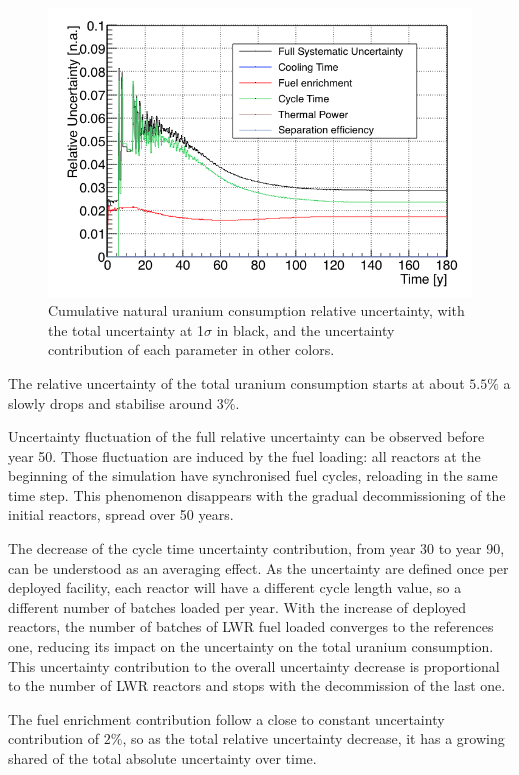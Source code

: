 \documentclass{anstrans}
\begin{document}
\begin{figure}[t] %
    \centering
    \includegraphics[scale=0.3]{unat_uncer}
    \caption{Cumulative natural uranium consumption relative uncertainty, with
    the total uncertainty at 1$\sigma$ in black, and the uncertainty
    contribution of each parameter in other colors.}\label{fig:unatr_uncer}
\end{figure}
The relative uncertainty of the total uranium consumption starts at about
$5.5\%$ a slowly drops and stabilise around $3\%$.

Uncertainty fluctuation of the full relative uncertainty can be observed before
year 50.  Those fluctuation are induced by the fuel loading: all reactors at the
beginning of the simulation have synchronised fuel cycles, reloading in the same time step.
This phenomenon disappears
with the gradual decommissioning of the initial reactors, spread over 50 years.

The decrease of the cycle time uncertainty contribution, from year 30 to year
90, can be understood as an averaging effect.  As the uncertainty are defined once
per deployed facility, each reactor will have a different cycle
length value, so a different number of batches loaded per year.  With the increase
of deployed reactors, the number of batches of \gls{LWR} fuel loaded converges
to the references one, reducing its impact on the uncertainty on the total
uranium consumption. This uncertainty contribution to the overall uncertainty
decrease is proportional to the number of \gls{LWR} reactors and stops with the
decommission of the last one.

The fuel enrichment contribution follow a close to constant uncertainty
contribution of $2\%$, so as the total relative uncertainty decrease, it
has a growing shared of the total absolute uncertainty over time.
\end{document}
